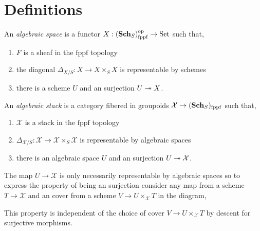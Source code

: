 \documentclass[12pt]{article}
\begin{document}
\section{Definitions}

\newcommand{\fppf}{\mathrm{fppf}}
\newcommand{\Set}{\mathrm{Set}}
\newcommand{\Def}{\mathrm{Def}}
\newcommand{\Inf}{\mathrm{Inf}}
\renewcommand{\X}{\mathcal{X}}
\newcommand{\Y}{\mathcal{Y}}
\newcommand{\Spf}[1]{\mathrm{Spf} \! \left(#1 \right)}
\renewcommand{\F}{\mathcal{F}}
\renewcommand{\G}{\mathcal{G}}


\begin{defn}
An \textit{algebraic space} is a functor $X : (\Sch_S)_{\fppf}^{\op} \to \Set$ such that,
\begin{enumerate}
\item $F$ is a sheaf in the $\fppf$ topology
\item the diagonal $\Delta_{X/S} : X \to X \times_S X$ is representable by schemes
\item there is a scheme $U$ and an \etale surjection $U \twoheadrightarrow X$.
\end{enumerate}
\end{defn}

\begin{defn}
An \textit{algebraic stack} is a category fibered in groupoids $\X \to (\Sch_S)_{\fppf}$ such that,
\begin{enumerate}
\item $\X$ is a stack in the $\fppf$ topology
\item $\Delta_{\X / S} : \X \to \X \times_S \X$ is representable by algebraic spaces 
\item there is an algebraic space $U$ and an \etale surjection $U \onto \X$.
\end{enumerate}
\end{defn}

\begin{rmk}
The map $U \to \X$ is only necessarily representable by algebraic spaces so to express the property of being an \etale surjection consider any map from a scheme $T \to \X$ and an \etale cover from a scheme $V \to U \times_{\X} T$ in the diagram,
\begin{center}
\end{center}
This property is independent of the choice of \etale cover $V \to U \times_{\X} T$ by \etale descent for \etale surjective morphisms.
\end{rmk}
\end{document}
